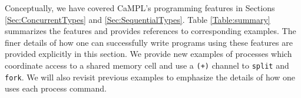 \documentclass[11pt]{article}
\begin{document}

Conceptually, we have covered CaMPL's programming features in Sections \ref{Sec:ConcurrentTypes} and \ref{Sec:SequentialTypes}.
Table \ref{Table:summary} summarizes the features and provides references to corresponding examples. 
The finer details of how one can successfully write programs using these features are provided explicitly in this section.
We provide new examples of processes which coordinate access to a shared memory cell and use a \lstinline{(+)} channel to \lstinline{split} and \lstinline{fork}.
We will also revisit previous examples to emphasize the details of how one uses each process command.
\end{document}
